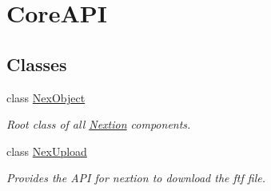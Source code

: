 \hypertarget{group___core_a_p_i}{}\section{Core\+A\+P\+I}
\label{group___core_a_p_i}
\subsection*{Classes}
\begin{DoxyCompactItemize}
\item 
class \hyperlink{class_nex_object}{Nex\+Object}
\begin{DoxyCompactList}\small\item\em Root class of all \hyperlink{class_nextion}{Nextion} components. \end{DoxyCompactList}\item 
class \hyperlink{class_nex_upload}{Nex\+Upload}
\begin{DoxyCompactList}\small\item\em Provides the A\+P\+I for nextion to download the ftf file. \end{DoxyCompactList}\end{DoxyCompactItemize}
